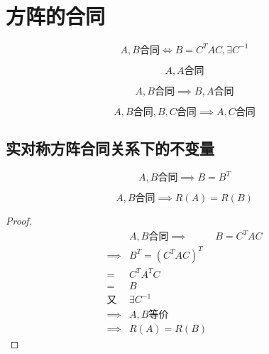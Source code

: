 \documentclass{article}
\begin{document}
\section{方阵的合同}

\begin{definition}[合同]
    \[A,B\text{合同}\iff B=C^TAC,\exists C^{-1}\]
\end{definition}

\begin{theorem}[反身性]
    \[A,A\text{合同}\]
\end{theorem}

\begin{theorem}[对称性]
    \[A,B\text{合同}\implies B,A\text{合同}\]
\end{theorem}

\begin{theorem}[传递性]
    \[A,B\text{合同},B,C\text{合同}\implies A,C\text{合同}\]
\end{theorem}

\subsection{实对称方阵合同关系下的不变量}

\begin{theorem}[合同方阵都是对称矩阵]
    \[A,B\text{合同}\implies B=B^T\]
\end{theorem}

\begin{corollary}[合同方阵秩相同]
    \[A,B\text{合同}\implies R\left(A\right)=R\left(B\right)\]
\end{corollary}

\begin{proof}
    \[\begin{aligned}
                      & A,B\text{合同}
            \implies  & B=C^TAC                         \\
            \implies  & B^T=\left(C^TAC\right)^T        \\
            =         & C^TA^TC                         \\
            =         & B                               \\
            \text{又} & \exists C^{-1}                  \\
            \implies  & A,B\text{等价}                  \\
            \implies  & R\left(A\right)=R\left(B\right)
        \end{aligned}\]
\end{proof}
\end{document}
